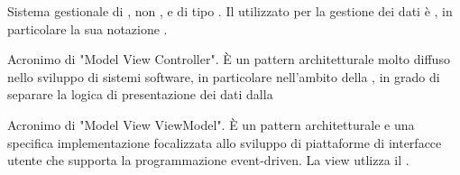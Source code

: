 {Sistema gestionale di , non ,  e di tipo . Il  utilizzato per la gestione dei dati è , in particolare la sua notazione .}

{Acronimo di "Model View Controller". \`{E} un pattern architetturale molto diffuso nello sviluppo di sistemi software, in particolare nell'ambito della , in grado di separare la logica di presentazione dei dati dalla }

{Acronimo di "Model View ViewModel". \`{E} un pattern architetturale e una specifica implementazione focalizzata allo sviluppo di piattaforme di interfacce utente che supporta la programmazione event-driven. La view utlizza il .}
